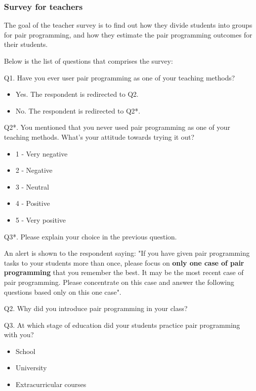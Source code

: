 \documentclass[conference]{IEEEtran}
\begin{document}
\subsubsection{Survey for teachers}

The goal of the teacher survey is to find out how they divide students into groups for pair programming, and how they estimate the pair programming outcomes for their students. 

Below is the list of questions that comprises the survey:

Q1. Have you ever user pair programming as one of your teaching methods?
    \begin{itemize}
        \item Yes. The respondent is redirected to Q2.
        \item No. The respondent is redirected to Q2*.
    \end{itemize}

Q2*. You mentioned that you never used pair programming as one of your teaching methods. What's your attitude towards trying it out?
    \begin{itemize}
        \item 1 - Very negative
        \item 2 - Negative
        \item 3 - Neutral
        \item 4 - Positive
        \item 5 - Very positive
    \end{itemize}

Q3*. Please explain your choice in the previous question.

An alert is shown to the respondent saying:
"If you have given pair programming tasks to your students more than once, please focus on \textbf{only one case of pair programming} that you remember the best. It may be the most recent case of pair programming. Please concentrate on this case and answer the following questions based only on this one case".

Q2. Why did you introduce pair programming in your class?

Q3. At which stage of education did your students practice pair programming with you?
    \begin{itemize}
        \item School
        \item University
        \item Extracurricular courses
    \end{itemize}
\end{document}
